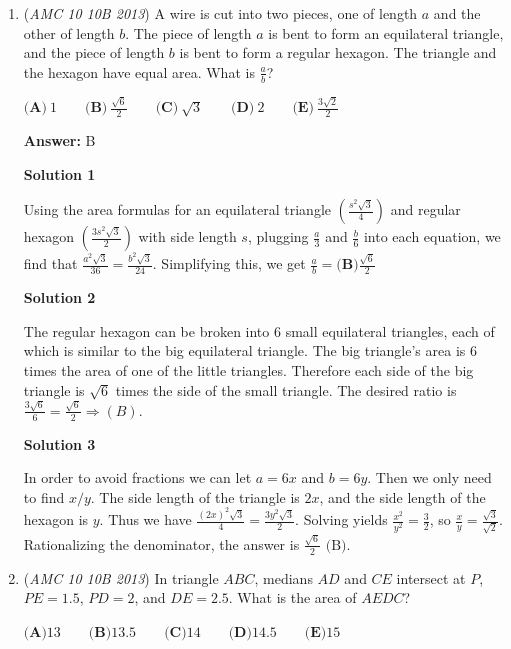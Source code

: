 \begin{enumerate}
 


	\item (\textit{AMC 10 10B 2013}) A wire is cut into two pieces, one of length $a$ and the other of length $b$. The piece of length $a$ is bent to form an equilateral triangle, and the piece of length $b$ is bent to form a regular hexagon. The triangle and the hexagon have equal area. What is $\frac{a}{b}$?


 $\textbf{(A)}\ 1\qquad\textbf{(B)}\ \frac{\sqrt{6}}{2}\qquad\textbf{(C)}\ \sqrt{3} \qquad\textbf{(D)}\ 2\qquad\textbf{(E)}\ \frac{3\sqrt{2}}{2}$

 \textbf{Answer: }B



\textbf{Solution 1}

Using the area formulas for an equilateral triangle $\left(\frac{{s}^{2}\sqrt{3}}{4}\right)$ and regular hexagon $\left(\frac{3{s}^{2}\sqrt{3}}{2}\right)$ with side length $s$, plugging $\frac{a}{3}$ and $\frac{b}{6}$ into each equation, we find that $\frac{{a}^{2}\sqrt{3}}{36}=\frac{{b}^{2}\sqrt{3}}{24}$. Simplifying this, we get $\frac{a}{b}=\boxed{\textbf{(B)} \frac{\sqrt{6}}{2}}$




\textbf{Solution 2}

The regular hexagon can be broken into 6 small equilateral triangles, each of which is similar to the big equilateral triangle. The big triangle's area is 6 times the area of one of the little triangles. Therefore each side of the big triangle is $\sqrt{6}$ times the side of the small triangle. The desired ratio is $\frac{3\sqrt{6}}{6}=\frac{\sqrt{6}}{2}\Rightarrow(B).$




\textbf{Solution 3}

In order to avoid fractions we can let $a = 6x$ and $b = 6y$. Then we only need to find $x/y$. The side length of the triangle is $2x$, and the side length of the hexagon is $y$. Thus we have $\frac{(2x)^2\sqrt{3}}{4} = \frac{3y^2\sqrt{3}}{2}$. Solving yields $\frac{x^2}{y^2} = \frac{3}{2}$, so $\frac{x}{y} = \frac{\sqrt{3}}{\sqrt{2}}$. Rationalizing the denominator, the answer is $\boxed{\frac{\sqrt{6}}{2}\text{ (B)}}$.

 


	\item (\textit{AMC 10 10B 2013}) In triangle $ABC$, medians $AD$ and $CE$ intersect at $P$, $PE=1.5$, $PD=2$, and $DE=2.5$.  What is the area of $AEDC$?


 $\textbf{(A)}13\qquad\textbf{(B)}13.5\qquad\textbf{(C)}14\qquad\textbf{(D)}14.5\qquad\textbf{(E)}15\qquad$


\end{enumerate}
